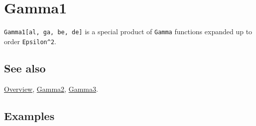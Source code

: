 \documentclass[../FeynCalcManual.tex]{subfiles}
\begin{document}
\hypertarget{gamma1}{%
\section{Gamma1}\label{gamma1}}

\texttt{Gamma1[\allowbreak{}al,\ \allowbreak{}ga,\ \allowbreak{}be,\ \allowbreak{}de]}
is a special product of \texttt{Gamma} functions expanded up to order
\texttt{Epsilon^2}.

\subsection{See also}

\hyperlink{toc}{Overview}, \hyperlink{gamma2}{Gamma2},
\hyperlink{gamma3}{Gamma3}.

\subsection{Examples}
\end{document}
